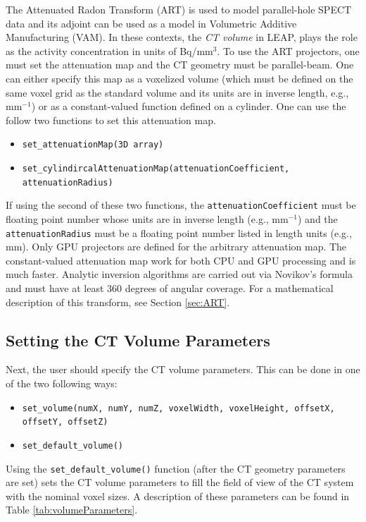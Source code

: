 \documentclass[11pt]{article}
\begin{document}
The Attenuated Radon Transform (ART) is used to model parallel-hole SPECT data and its adjoint can be used as a model in Volumetric Additive Manufacturing (VAM).  In  these contexts, the \textit{CT volume} in LEAP, plays the role as the activity concentration in units of Bq/mm$^3$.  To use the ART projectors, one must set the attenuation map and the CT geometry must be parallel-beam.  One can either specify this map as a voxelized volume (which must be defined on the same voxel grid as the standard volume and its units are in inverse length, e.g., mm$^{-1}$) or as a constant-valued function defined on a cylinder.  One can use the follow two functions to set this attenuation map.
\begin{itemize}
    \item[] \texttt{set\_attenuationMap(3D array)}
    \item[] \texttt{set\_cylindircalAttenuationMap(attenuationCoefficient, attenuationRadius)}
\end{itemize}
If using the second of these two functions, the \texttt{attenuationCoefficient} must be floating point number whose units are in inverse length (e.g., mm$^{-1}$) and the \texttt{attenuationRadius} must be a floating point number listed in length units (e.g., mm).  Only GPU projectors are defined for the arbitrary attenuation map.  The constant-valued attenuation map work for both CPU and GPU processing and is much faster.  Analytic inversion algorithms are carried out via Novikov's formula \cite{Natterer_IP_2001} and must have at least 360 degrees of angular coverage.  For a mathematical description of this transform, see Section \ref{sec:ART}.

\subsection{Setting the CT Volume Parameters}

Next, the user should specify the CT volume parameters.  This can be done in one of the two following ways:
\begin{itemize}
\item[] \texttt{set\_volume(numX, numY, numZ, voxelWidth, voxelHeight, offsetX, offsetY, offsetZ)}
\item[] \texttt{set\_default\_volume()}
\end{itemize}
Using the \texttt{set\_default\_volume()} function (after the CT geometry parameters are set) sets the CT volume parameters to fill the field of view of the CT system with the nominal voxel sizes.  A description of these parameters can be found in Table \ref{tab:volumeParameters}.
\end{document}
